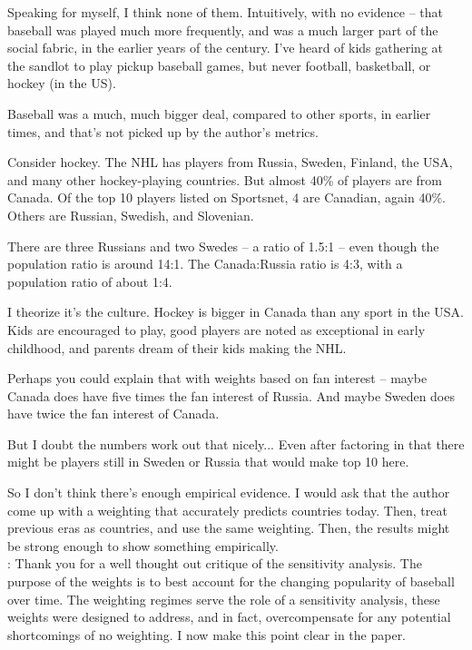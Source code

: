 \documentclass[11pt]{article}
\begin{document}
Speaking for myself, I think none of them.  Intuitively, with no evidence -- 
that baseball was played much more frequently, and was a much larger part of 
the social fabric, in the earlier years of the century.  I've heard of kids 
gathering at the sandlot to play pickup baseball games, but never football, 
basketball, or hockey (in the US). 

Baseball was a much, much bigger deal, compared to other sports, in earlier 
times, and that's not picked up by the author's metrics. 

Consider hockey.  The NHL has players from Russia, Sweden, Finland, the USA, 
and many other hockey-playing countries.  But almost 40\% of players are from 
Canada.  Of the top 10 players listed on Sportsnet, 4 are Canadian, again 40\%.  
Others are Russian, Swedish, and Slovenian. 

There are three Russians and two Swedes -- a ratio of 1.5:1 -- even though the 
population ratio is around 14:1.  The Canada:Russia ratio is 4:3, with a 
population ratio of about 1:4.

I theorize it's the culture.  Hockey is bigger in Canada than any sport in the 
USA.  Kids are encouraged to play, good players are noted as exceptional in 
early childhood, and parents dream of their kids making the NHL.

Perhaps you could explain that with weights based on fan interest -- maybe 
Canada does have five times the fan interest of Russia.  And maybe Sweden 
does have twice the fan interest of Canada. 

But I doubt the numbers work out that nicely... Even after factoring in that 
there might be players still in Sweden or Russia that would make top 10 here.  

So I don't think there's enough empirical evidence.  I would ask that the 
author come up with a weighting that accurately predicts countries today.  
Then, treat previous eras as countries, and use the same weighting.  Then, 
the results might be strong enough to show something empirically. \\



:  
Thank you for a well thought out critique of the sensitivity analysis.
The purpose of the weights is to best account for the changing popularity of 
baseball over time.  
The weighting regimes serve the role of a sensitivity analysis, these weights 
were designed to address, and in fact, overcompensate for any potential 
shortcomings of no weighting.
I now make this point clear in the paper.
\end{document}
